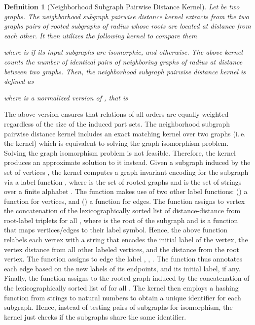 \documentclass[twoside,11pt]{article}
\newcommand{\ie}{i.\,e. }
\newtheorem{definition}{Definition}
\begin{document}
\begin{definition}[Neighborhood Subgraph Pairwise Distance Kernel]
	Let  be two graphs.
	The neighborhood subgraph pairwise distance kernel extracts from the two graphs pairs of rooted subgraphs of radius  whose roots are located at distance  from each other.
	It then utilizes the following kernel to compare them
	
	where  is  if its input subgraphs are isomorphic, and  otherwise.
	The above kernel counts the number of identical pairs of neighboring graphs of radius  at distance  between two graphs.
	Then, the neighborhood subgraph pairwise distance kernel is defined as
	
	where  is a normalized version of , that is
	
\end{definition}
The above version ensures that relations of all orders are equally weighted regardless of the size of the induced part sets.
The neighborhood subgraph pairwise distance kernel includes an exact matching kernel over two graphs (\ie the  kernel) which is equivalent to solving the graph isomorphism problem.
Solving the graph isomorphism problem is not feasible.
Therefore, the kernel produces an approximate solution to it instead.
Given a subgraph  induced by the set of vertices , the kernel computes a graph invariant encoding for the subgraph via a label function , where  is the set of rooted graphs and  is the set of strings over a finite alphabet .
The function  makes use of two other label functions: () a function  for vertices, and () a function  for edges.
The  function assigns to vertex  the concatenation of the lexicographically sorted list of distance-distance from root-label triplets  for all , where  is the root of the subgraph and  is a function that maps vertices/edges to their label symbol.
Hence, the above function relabels each vertex with a string that encodes the initial label of the vertex, the vertex distance from all other labeled vertices, and the distance from the root vertex.
The  function assigns to edge  the label , , .
The  function thus annotates each edge based on the new labels of its endpoints, and its initial label, if any.
Finally, the function  assigns to the rooted graph induced by  the concatenation of the lexicographically sorted list of  for all .
The kernel then employs a hashing function from strings to natural numbers  to obtain a unique identifier for each subgraph.
Hence, instead of testing pairs of subgraphs for isomorphism, the kernel just checks if the subgraphs share the same identifier.
\end{document}

